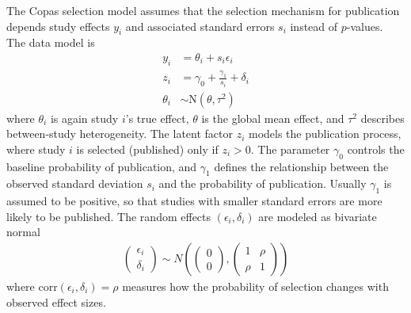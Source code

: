 \documentclass[12pt]{article}   	%
\numberwithin{equation}{section}
\begin{document}
The Copas selection model \citep{copas1999what, copas2000funnel, copas2001sensitivity} assumes that the selection mechanism for publication depends study effects $y_i$ and associated standard errors $s_i$ instead of $p$-values. The data model is
\begin{align}
y_i &= \theta_i + s_i \epsilon_i \label{eq:copas_y} \\
z_i &= \gamma_0 + \frac{\gamma_1}{s_i} + \delta_i \label{eq:zi} \\
\theta_i & \sim \mbox{N}(\theta, \tau^2) \label{eq:copas_theta}
\end{align}
where $\theta_i$ is again study $i$'s true effect, $\theta$ is the global mean effect, and $\tau^2$ describes between-study heterogeneity. The latent factor $z_i$ models the publication process, where study $i$ is selected (published) only if $z_i > 0$. The parameter $\gamma_0$ controls the baseline probability of publication, and $\gamma_1$ defines the relationship between the observed standard deviation $s_i$ and the probability of publication. Usually $\gamma_1$ is assumed to be positive, so that studies with smaller standard errors are more likely to be published. The random effects $(\epsilon_i, \delta_i)$ are modeled as bivariate normal
\begin{align}
\begin{pmatrix}
\epsilon_i \\
\delta_i
\end{pmatrix}\sim N\left(\begin{pmatrix}
0 \\
0
\end{pmatrix},\begin{pmatrix}
1 & \rho \\
\rho & 1
\end{pmatrix}\right) \label{eq:epsilon}
\end{align}
where corr$(\epsilon_i, \delta_i) = \rho$ measures how the probability of selection changes with observed effect sizes.
\end{document}
